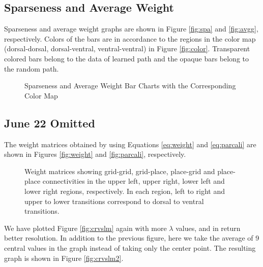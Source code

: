 \documentclass[11pt, letterpaper, onecolumn]{article}
\begin{document}
\subsection{Sparseness and Average Weight}
Sparseness and average weight graphs are shown in Figure \ref{fig:spa} and \ref{fig:avgg}, respectively. Colors of the bars are in accordance to the regions in the color map (dorsal-dorsal, dorsal-ventral, ventral-ventral) in Figure \ref{fig:color}. Transparent colored bars belong to the data of learned path and the opaque bars belong to the random path.

\begin{figure}[H]
\centering
\caption{Sparseness and Average Weight Bar Charts with the Corresponding Color Map}
\label{fig:sparseavg}
\end{figure}

\subsection{June 22 Omitted}

The weight matrices obtained by using Equations \ref{eq:weight} and \ref{eq:parcali} are shown in Figures \ref{fig:weight} and \ref{fig:parcali}, respectively. 

\begin{figure}[H]
\centering
\caption{Weight matrices showing grid-grid, grid-place, place-grid and place-place connectivities in the upper left, upper right, lower left and lower right regions, respectively. In each region, left to right and upper to lower transitions correspond to dorsal to ventral transitions.}
\label{fig:wm}
\end{figure}


We have plotted Figure \ref{fig:crvslm} again with more $ \lambda $ values, and in return better resolution. In addition to the previous figure, here we take the average of 9 central values in the graph instead of taking only the center point. The resulting graph is shown in Figure \ref{fig:crvslm2}.
\end{document}
